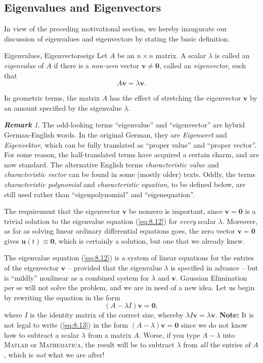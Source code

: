 \documentclass[12pt]{article}
\theoremstyle{remark}
\newtheorem*{remark}{\textbf{Remark}}
\begin{document}
\subsection{Eigenvalues and Eigenvectors}
In view of the preceding motivational section, we hereby inaugurate our discussion of eigenvalues and eigenvectors by stating the basic definition.
\begin{dfn}{Eigenvalues, Eigenvectors}{eigs}
    Let $A$ be an $n\times n$ matrix. A scalar $\lambda$ is called an \emph{eigenvalue} of $A$ if there is a \emph{non-zero} vector $\mathbf{v}\neq \mathbf{0}$, called an \emph{eigenvector}, such that
    \begin{equation}
        A\mathbf{v} = \lambda \mathbf{v}.
        \label{eq:8.12}
    \end{equation}
\end{dfn}
In geometric terms, the matrix $A$ has the effect of stretching the eigenvector $\mathbf{v}$ by an amount specified by the eigenvalue $\lambda$.
\begin{remark}
    The odd-looking terms ``eigenvalue'' and ``eigenvector'' are hybrid German-English words. In the original German, they are \emph{Eigenwert} and \emph{Eigenvektor}, which can be fully translated as ``proper value'' and ``proper vector''. For some reason, the half-translated terms have acquired a certain charm, and are now standard. The alternative English terms \emph{characteristic value} and \emph{characteristic vector} can be found in some (mostly older) texts. Oddly, the terms \emph{characteristic polynomial} and \emph{characteristic equation}, to be defined below, are still used rather than ``eigenpolynomial'' and ``eigenequation''.
\end{remark}

The requirement that the eigenvector $\mathbf{v}$ be nonzero is important, since $\mathbf{v}=\mathbf{0}$ is a trivial solution to the eigenvalue equation (\ref{eq:8.12}) for \emph{every} scalar $\lambda$. Moreover, as far as solving linear ordinary differential equations goes, the zero vector $\mathbf{v}=\mathbf{0}$ gives $\mathbf{u}(t)\equiv \mathbf{0}$, which is certainly a solution, but one that we already knew.

The eigenvalue equation (\ref{eq:8.12}) is a system of linear equations for the entries of the eigenvector $\mathbf{v}$ -- provided that the eigenvalue $\lambda$ is specified in advance -- but is ``mildly'' nonlinear as a combined system for $\lambda$ and $\mathbf{v}$. Gaussian Elimination per se will not solve the problem, and we are in need of a new idea. Let us begin by rewriting the equation in the form
\begin{equation}
    \left(A-\lambda I\right)\mathbf{v}=\mathbf{0},
    \label{eq:8.13}
\end{equation}
where $I$ is the identity matrix of the correct size, whereby $\lambda I\mathbf{v}=\lambda\mathbf{v}$. \textbf{Note:} It is not legal to write (\ref{eq:8.13}) in the form $\left(A-\lambda\right)\mathbf{v}=\mathbf{0}$ since we do not know how to subtract a scalar $\lambda$ from a matrix $A$. Worse, if you type $A-\lambda$ into \textsc{Matlab} or \textsc{Mathematica}, the result will be to subtract $\lambda$ from \emph{all} the entries of $A$, which is \emph{not} what we are after!
\end{document}
